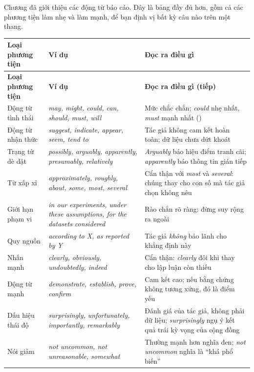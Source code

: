 \documentclass[../../english.tex]{subfiles}
\begin{document}
Chương  đã giới thiệu các động từ báo cáo. Đây là bảng đầy đủ hơn, gồm cả các phương tiện làm nhẹ và làm mạnh, để bạn định vị bất kỳ câu nào trên một thang.

\begin{center}\footnotesize
{}
\begin{longtable}{@{}L{3.2cm}L{5.0cm}L{6.2cm}@{}}
\toprule
\textbf{Loại phương tiện} & \textbf{Ví dụ} & \textbf{Đọc ra điều gì}\\
\midrule
\endfirsthead
\toprule
\textbf{Loại phương tiện} & \textbf{Ví dụ} & \textbf{Đọc ra điều gì (tiếp)}\\
\midrule
\endhead
Động từ tình thái & \emph{may, might, could, can, should, must, will} & Mức chắc chắn; \emph{could} nhẹ nhất, \emph{must} mạnh nhất ()\\
Động từ nhận thức & \emph{suggest, indicate, appear, seem, tend to} & Tác giả không cam kết hoàn toàn; dữ liệu chưa dứt khoát\\
Trạng từ dè dặt & \emph{possibly, arguably, apparently, presumably, relatively} & \emph{Arguably} báo hiệu điểm tranh cãi; \emph{apparently} báo thông tin gián tiếp\\
Từ xấp xỉ & \emph{approximately, roughly, about, some, most, several} & Cẩn thận với \emph{most} và \emph{several}: chúng thay cho con số mà tác giả chọn không nêu\\
Giới hạn phạm vi & \emph{in our experiments, under these assumptions, for the datasets considered} & Rào chắn rõ ràng: đừng suy rộng ra ngoài\\
Quy nguồn & \emph{according to X, as reported by Y} & Tác giả \emph{không} bảo lãnh cho khẳng định này\\
Nhấn mạnh & \emph{clearly, obviously, undoubtedly, indeed} & Cẩn thận: \emph{clearly} đôi khi thay cho lập luận còn thiếu\\
Động từ mạnh & \emph{demonstrate, establish, prove, confirm} & Cam kết cao; nếu bằng chứng không tương xứng, đó là điểm yếu\\
Dấu hiệu thái độ & \emph{surprisingly, unfortunately, importantly, remarkably} & Đánh giá của tác giả, không phải dữ liệu; \emph{surprisingly} ngụ ý kết quả trái kỳ vọng của cộng đồng\\
Nói giảm & \emph{not uncommon, not unreasonable, somewhat} & Thường mạnh hơn nghĩa đen; \emph{not uncommon} nghĩa là ``khá phổ biến''\\
\bottomrule
\end{longtable}
\end{center}
\end{document}
